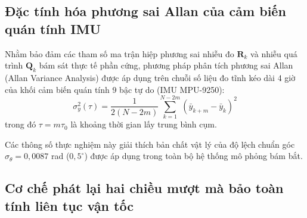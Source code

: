 \subsection{Đặc tính hóa phương sai Allan của cảm biến quán tính IMU}

\hspace{0.5cm} Nhằm bảo đảm các tham số ma trận hiệp phương sai nhiễu đo $\mathbf{R}_k$ và nhiễu quá trình $\mathbf{Q}_k$ bám sát thực tế phần cứng, phương pháp phân tích phương sai Allan (Allan Variance Analysis) được áp dụng trên chuỗi số liệu đo tĩnh kéo dài 4 giờ của khối cảm biến quán tính 9 bậc tự do (IMU MPU-9250):
\begin{equation}
\sigma_y^2(\tau) = \frac{1}{2(N - 2m)} \sum_{k=1}^{N - 2m} \left( \bar{y}_{k+m} - \bar{y}_k \right)^2
\label{eq:allan-variance-formula}
\end{equation}
trong đó $\tau = m \tau_0$ là khoảng thời gian lấy trung bình cụm.

\begin{table}[H]
\centering
\caption{Các hệ số nhiễu quán tính trích xuất từ đồ thị phương sai Allan của cảm biến}
\label{tab:allan-variance-coefficients}
\end{table}

Các thông số thực nghiệm này giải thích bản chất vật lý của độ lệch chuẩn góc $\sigma_\theta = 0{,}0087$ rad ($0{,}5^\circ$) được áp dụng trong toàn bộ hệ thống mô phỏng bám bắt.

\subsection{Cơ chế phát lại hai chiều mượt mà bảo toàn tính liên tục vận tốc}

